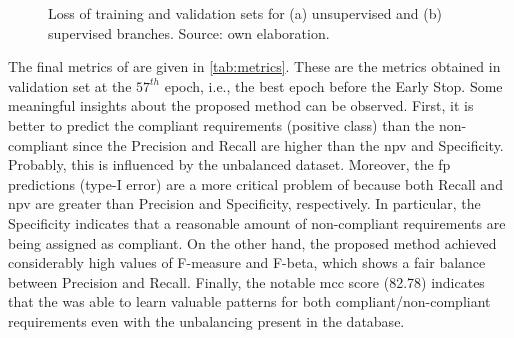 \begin{figure}[tb]
\centering
{}
\hfill
\ContinuedFloat
{}
\caption{Loss of training and validation sets for (a) unsupervised and (b) supervised branches. Source: own elaboration.}
\label{fig:losses}
\end{figure}

The final metrics of \methodname are given in \autoref{tab:metrics}. These are the metrics obtained in validation set at the $57^{th}$ epoch, i.e., the best epoch before the Early Stop. Some meaningful insights about the proposed method can be observed. First, it is better to predict the compliant requirements (positive class) than the non-compliant since the Precision and Recall are higher than the \acs{npv} and Specificity. Probably, this is influenced by the unbalanced dataset. Moreover, the \acl{fp} predictions (type-I error) are a more critical problem of \methodname because both Recall and \acs{npv} are greater than Precision and Specificity, respectively. In particular, the Specificity indicates that a reasonable amount of non-compliant requirements are being assigned as compliant. On the other hand, the proposed method achieved considerably high values of F-measure and F-beta, which shows a fair balance between Precision and Recall. Finally, the notable \acs{mcc} score (82.78) indicates that the \methodname was able to learn valuable patterns for both compliant/non-compliant requirements even with the unbalancing present in the \adhoc database.

